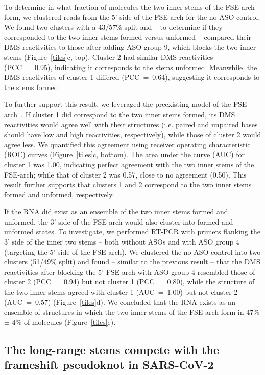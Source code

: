 \documentclass[main.tex]{subfiles}
\begin{document}
To determine in what fraction of molecules the two inner stems of the FSE-arch form, we clustered reads from the 5' side of the FSE-arch for the no-ASO control.
We found two clusters with a 43/57\% split and -- to determine if they corresponded to the two inner stems formed versus unformed -- compared their DMS reactivities to those after adding ASO group 9, which blocks the two inner stems (Figure~\ref{tiles}c, top).
Cluster 2 had similar DMS reactivities (PCC~=~0.95), indicating it corresponds to the stems unformed.
Meanwhile, the DMS reactivities of cluster 1 differed (PCC~=~0.64), suggesting it corresponds to the stems formed.

To further support this result, we leveraged the preexisting model of the FSE-arch~\cite{Ziv2020}.
If cluster 1 did correspond to the two inner stems formed, its DMS reactivities would agree well with their structures (i.e. paired and unpaired bases should have low and high reactivities, respectively), while those of cluster 2 would agree less.
We quantified this agreement using receiver operating characteristic (ROC) curves (Figure~\ref{tiles}c, bottom).
The area under the curve (AUC) for cluster 1 was 1.00, indicating perfect agreement with the two inner stems of the FSE-arch; while that of cluster 2 was 0.57, close to no agreement (0.50).
This result further supports that clusters 1 and 2 correspond to the two inner stems formed and unformed, respectively.

If the RNA did exist as an ensemble of the two inner stems formed and unformed, the 3' side of the FSE-arch would also cluster into formed and unformed states.
To investigate, we performed RT-PCR with primers flanking the 3' side of the inner two stems -- both without ASOs and with ASO group 4 (targeting the 5' side of the FSE-arch).
We clustered the no-ASO control into two clusters (51/49\% split) and found -- similar to the previous result -- that the DMS reactivities after blocking the 5' FSE-arch with ASO group 4 resembled those of cluster 2 (PCC~=~0.94) but not cluster 1 (PCC~=~0.80), while the structure of the two inner stems agreed with cluster 1 (AUC~=~1.00) but not cluster 2 (AUC~=~0.57) (Figure~\ref{tiles}d).
We concluded that the RNA exists as an ensemble of structures in which the two inner stems of the FSE-arch form in 47\% ± 4\% of molecules (Figure~\ref{tiles}e).

\subsection{The long-range stems compete with the frameshift pseudoknot in SARS-CoV-2}
\end{document}
